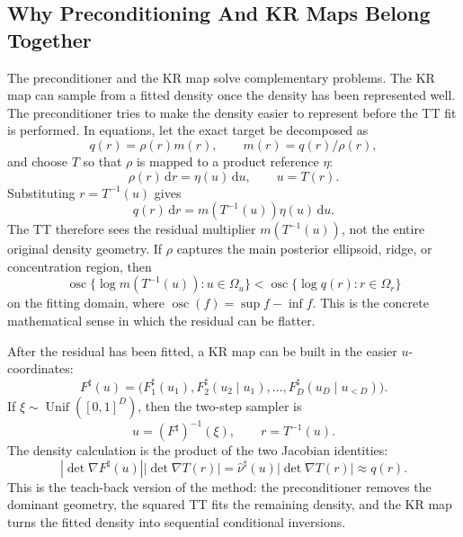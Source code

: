 \documentclass[11pt]{article}
\numberwithin{equation}{section}
\newcommand{\dd}{\,\mathrm d}
\begin{document}
\subsection*{Why Preconditioning And KR Maps Belong Together}

The preconditioner and the KR map solve complementary problems.  The KR map
can sample from a fitted density once the density has been represented well.
The preconditioner tries to make the density easier to represent before the TT
fit is performed.  In equations, let the exact target be decomposed as
\begin{equation}
    q(r)=\rho(r)m(r),
    \qquad m(r)=q(r)/\rho(r),
    \label{eq:p26-prec-teach-1}
\end{equation}
and choose \(T\) so that \(\rho\) is mapped to a product reference \(\eta\):
\begin{equation}
    \rho(r)\dd r
    =
    \eta(u)\dd u,
    \qquad u=T(r).
    \label{eq:p26-prec-teach-2}
\end{equation}
Substituting \(r=T^{-1}(u)\) gives
\begin{equation}
    q(r)\dd r
    =
    m(T^{-1}(u))\eta(u)\dd u.
    \label{eq:p26-prec-teach-3}
\end{equation}
The TT therefore sees the residual multiplier \(m(T^{-1}(u))\), not the
entire original density geometry.  If \(\rho\) captures the main posterior
ellipsoid, ridge, or concentration region, then
\begin{equation}
    \operatorname{osc}\{\log m(T^{-1}(u)):u\in\Omega_u\}
    <
    \operatorname{osc}\{\log q(r):r\in\Omega_r\}
    \label{eq:p26-prec-teach-4}
\end{equation}
on the fitting domain, where \(\operatorname{osc}(f)=\sup f-\inf f\).  This is
the concrete mathematical sense in which the residual can be flatter.

After the residual has been fitted, a KR map can be built in the easier
\(u\)-coordinates:
\begin{equation}
    F^\sharp(u)
    =
    \bigl(F^\sharp_1(u_1),
    F^\sharp_2(u_2\mid u_1),\ldots,
    F^\sharp_D(u_D\mid u_{<D})\bigr).
    \label{eq:p26-prec-teach-5}
\end{equation}
If \(\xi\sim\operatorname{Unif}([0,1]^D)\), then the two-step sampler is
\begin{equation}
    u=(F^\sharp)^{-1}(\xi),
    \qquad
    r=T^{-1}(u).
    \label{eq:p26-prec-teach-6}
\end{equation}
The density calculation is the product of the two Jacobian identities:
\begin{equation}
    \left|\det\nabla F^\sharp(u)\right|
    \left|\det\nabla T(r)\right|
    =
    \widehat\nu^\sharp(u)
    \left|\det\nabla T(r)\right|
    \approx q(r).
    \label{eq:p26-prec-teach-7}
\end{equation}
This is the teach-back version of the method: the preconditioner removes the
dominant geometry, the squared TT fits the remaining density, and the KR map
turns the fitted density into sequential conditional inversions.
\end{document}
